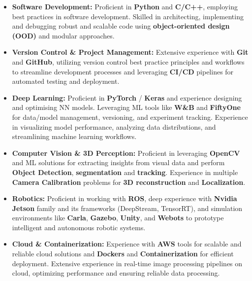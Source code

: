 \documentclass[10pt]{res}
\begin{document}
\begin{resume}


\begin{itemize} \itemsep 1pt

\item {\bf Software Development:} Proficient in \textbf{Python} and \textbf{C/C++}, employing best practices in software development. Skilled in architecting, implementing and debugging robust and scalable code using \textbf{object-oriented design (OOD)} and modular approaches. 

\item {\bf Version Control \& Project Management:} Extensive experience with \textbf{Git} and \textbf{GitHub}, utilizing version control best practice principles and workflows to streamline development processes and leveraging \textbf{CI/CD} pipelines for automated testing and deployment.

\item {\bf Deep Learning:} Proficient in \textbf{PyTorch} / \textbf{Keras} and experience designing and optimising NN models. Leveraging ML tools like \textbf{W\&B} and \textbf{FiftyOne} for data/model management, versioning, and experiment tracking. Experience in visualizing model performance, analyzing data distributions, and streamlining machine learning workflows.

\item {\bf Computer Vision \& 3D Perception:} Proficient in leveraging \textbf{OpenCV} and ML solutions for extracting insights from visual data and perform \textbf{Object Detection}, \textbf{segmentation} and \textbf{tracking}. Experience in multiple \textbf{Camera Calibration} problems for \textbf{3D reconstruction} and \textbf{Localization}.

\item {\bf Robotics:} Proficient in working with \textbf{ROS}, deep experience with \textbf{Nvidia Jetson} family and its frameworks (DeepStream, TensorRT), and simulation environments like \textbf{Carla}, \textbf{Gazebo}, \textbf{Unity}, and \textbf{Webots} to prototype intelligent and autonomous robotic systems.

\item {\bf Cloud \& Containerization:} Experience with \textbf{AWS} tools for scalable and reliable cloud solutions and \textbf{Dockers} and \textbf{Containerization} for efficient deployment. Extensive experience in real-time image processing pipelines on cloud, optimizing performance and ensuring reliable data processing.


\end{itemize}
\end{resume}
\end{document}
